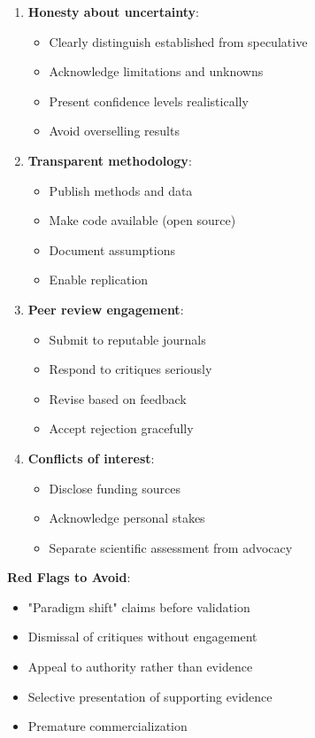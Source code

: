 \begin{enumerate}
    \item \textbf{Honesty about uncertainty}:
    \begin{itemize}
        \item Clearly distinguish established from speculative
        \item Acknowledge limitations and unknowns
        \item Present confidence levels realistically
        \item Avoid overselling results
    \end{itemize}

    \item \textbf{Transparent methodology}:
    \begin{itemize}
        \item Publish methods and data
        \item Make code available (open source)
        \item Document assumptions
        \item Enable replication
    \end{itemize}

    \item \textbf{Peer review engagement}:
    \begin{itemize}
        \item Submit to reputable journals
        \item Respond to critiques seriously
        \item Revise based on feedback
        \item Accept rejection gracefully
    \end{itemize}

    \item \textbf{Conflicts of interest}:
    \begin{itemize}
        \item Disclose funding sources
        \item Acknowledge personal stakes
        \item Separate scientific assessment from advocacy
    \end{itemize}
\end{enumerate}

\textbf{Red Flags to Avoid}:
\begin{itemize}
    \item "Paradigm shift" claims before validation
    \item Dismissal of critiques without engagement
    \item Appeal to authority rather than evidence
    \item Selective presentation of supporting evidence
    \item Premature commercialization
\end{itemize}

